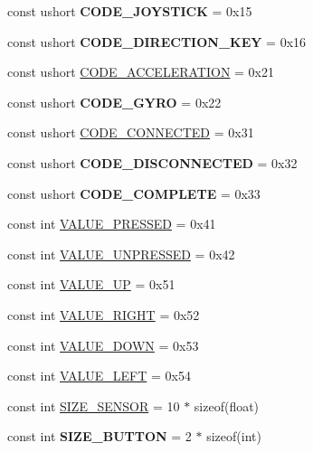 \begin{DoxyCompactItemize}
\item 
\hypertarget{class_g_cconst_a65914551560b5254e65f35a8668e4dff}{}const ushort {\bfseries C\+O\+D\+E\+\_\+\+J\+O\+Y\+S\+T\+I\+C\+K} = 0x15\label{class_g_cconst_a65914551560b5254e65f35a8668e4dff}

\item 
\hypertarget{class_g_cconst_ab69f6e01d674019db0d5a229b157cad6}{}const ushort {\bfseries C\+O\+D\+E\+\_\+\+D\+I\+R\+E\+C\+T\+I\+O\+N\+\_\+\+K\+E\+Y} = 0x16\label{class_g_cconst_ab69f6e01d674019db0d5a229b157cad6}

\item 
const ushort \hyperlink{class_g_cconst_a84fdd379bbb0355e8d1abec0338c7305}{C\+O\+D\+E\+\_\+\+A\+C\+C\+E\+L\+E\+R\+A\+T\+I\+O\+N} = 0x21
\item 
\hypertarget{class_g_cconst_afdbe82aacd4ebe510c3f8ddaa609b42b}{}const ushort {\bfseries C\+O\+D\+E\+\_\+\+G\+Y\+R\+O} = 0x22\label{class_g_cconst_afdbe82aacd4ebe510c3f8ddaa609b42b}

\item 
const ushort \hyperlink{class_g_cconst_a03588045b902424b55b70524bd81a7d0}{C\+O\+D\+E\+\_\+\+C\+O\+N\+N\+E\+C\+T\+E\+D} = 0x31
\item 
\hypertarget{class_g_cconst_a484076ed934580daba95f65bd86d6c25}{}const ushort {\bfseries C\+O\+D\+E\+\_\+\+D\+I\+S\+C\+O\+N\+N\+E\+C\+T\+E\+D} = 0x32\label{class_g_cconst_a484076ed934580daba95f65bd86d6c25}

\item 
\hypertarget{class_g_cconst_ae0d7a3f3581392fcfbab6ed03a738287}{}const ushort {\bfseries C\+O\+D\+E\+\_\+\+C\+O\+M\+P\+L\+E\+T\+E} = 0x33\label{class_g_cconst_ae0d7a3f3581392fcfbab6ed03a738287}

\item 
const int \hyperlink{class_g_cconst_ab29addae403721e28db58d3d588d7cb6}{V\+A\+L\+U\+E\+\_\+\+P\+R\+E\+S\+S\+E\+D} = 0x41
\item 
const int \hyperlink{class_g_cconst_ae71573553c10f6fa0dce4c8ef2a27e10}{V\+A\+L\+U\+E\+\_\+\+U\+N\+P\+R\+E\+S\+S\+E\+D} = 0x42
\item 
const int \hyperlink{class_g_cconst_a5cc16bbe1d7540c883cc97a9dabbda20}{V\+A\+L\+U\+E\+\_\+\+U\+P} = 0x51
\item 
const int \hyperlink{class_g_cconst_ad572252971cc0adfaf37afda6b160bb4}{V\+A\+L\+U\+E\+\_\+\+R\+I\+G\+H\+T} = 0x52
\item 
const int \hyperlink{class_g_cconst_acfcbfa00f9a29aae8b79a1bc6f87ffb4}{V\+A\+L\+U\+E\+\_\+\+D\+O\+W\+N} = 0x53
\item 
const int \hyperlink{class_g_cconst_a3907d5bdd4ff673e4a57380a701bf110}{V\+A\+L\+U\+E\+\_\+\+L\+E\+F\+T} = 0x54
\item 
const int \hyperlink{class_g_cconst_a13a353e3da52e3a0454487664c360dab}{S\+I\+Z\+E\+\_\+\+S\+E\+N\+S\+O\+R} = 10 $\ast$ sizeof(float)
\item 
\hypertarget{class_g_cconst_aab30a3dfdb77464086d7198f78bdbde3}{}const int {\bfseries S\+I\+Z\+E\+\_\+\+B\+U\+T\+T\+O\+N} = 2 $\ast$ sizeof(int)\label{class_g_cconst_aab30a3dfdb77464086d7198f78bdbde3}


\end{DoxyCompactItemize}
